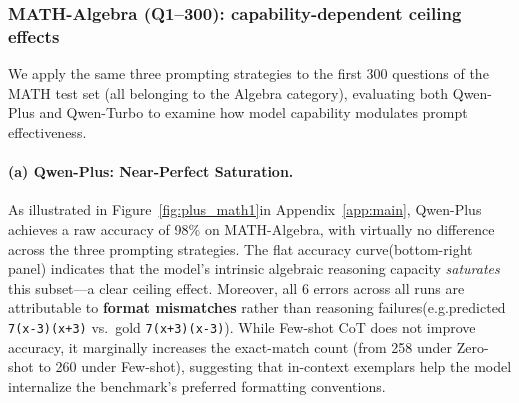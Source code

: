 \documentclass{article}
\begin{document}
\subsubsection{MATH-Algebra (Q1--300): capability-dependent ceiling effects}
\label{sec:math300}
We apply the same three prompting strategies to the first 300 questions of the MATH test set (all belonging to the Algebra category), evaluating both Qwen-Plus and Qwen-Turbo to examine how model capability modulates prompt effectiveness.
\paragraph{(a) Qwen-Plus: Near-Perfect Saturation.}

As illustrated in Figure~\ref{fig:plus_math1}in Appendix~\ref{app:main}, Qwen-Plus achieves a raw accuracy of 98\% on MATH-Algebra, with virtually no difference across the three prompting strategies. The flat accuracy curve(bottom-right panel) indicates that the model's intrinsic algebraic reasoning capacity \textit{saturates} this subset---a clear ceiling effect.
Moreover, all 6 errors across all runs are attributable to \textbf{format mismatches} rather than reasoning failures(e.g.predicted \texttt{7(x-3)(x+3)} vs.\ gold \texttt{7(x+3)(x-3)}). 
While Few-shot CoT does not improve accuracy, it marginally increases the exact-match count (from 258 under Zero-shot to 260 under Few-shot), suggesting that in-context exemplars help the model internalize the benchmark's preferred formatting conventions.
\end{document}
